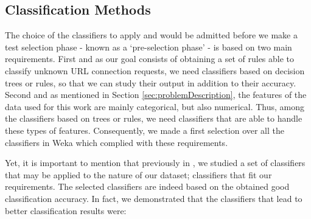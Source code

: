 \documentclass{llncs}
\begin{document}
%
\subsection{Classification Methods}
\label{subsec:methods}

\noindent The choice of the classifiers to apply and would be admitted before we make a test selection phase - known as a `pre-selection phase' - is based on two main requirements. First and as our goal consists of obtaining a set of rules able to classify unknown URL connection requests,  we need classifiers based on decision trees or rules, so that we can study their output in addition to their accuracy. Second and as mentioned in Section \ref{sec:problemDescription}, the features of the data used for this work are mainly categorical, but also numerical. Thus, among the classifiers based on trees or rules, we need classifiers that are able to handle these types of features. Consequently, we made a first selection over all the classifiers in Weka which complied with these requirements.

Yet, it is important to mention that previously in \cite{ECTA}, we studied a set of classifiers that may be applied to the nature of our dataset; classifiers that fit our requirements. The selected classifiers are indeed based on the obtained good classification accuracy. In fact, we demonstrated that the classifiers that lead to better classification results were:
\end{document}
